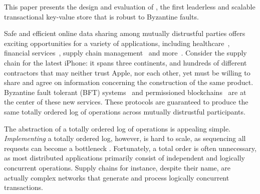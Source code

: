 \iffalse
Please check these links from the ref.bib yourself. Most of them are internet pages. (some only secondary sources, i.e. articles, so they may be useless). Some whitepapers\\
Health: \cite{HyperledgerHealth}\\
Insurance Services \cite{StateFarmSubrogation}   secondary sources: \cite{StateFarmQuorum, StateFarmQuorum2}\\
Financial: \cite{IBMSettlements, Libra}\\
Supply Chain:  \cite{IBMFoodSupply, DeloitteSupply}   secondary sources: \cite{SupplyExamples,}\\
Other:  \cite{HyperledgerTelecom}  secondary sources: \cite{AutoInventory}\\
\fi


This paper presents the design and evaluation of \sys{}, the first leaderless and scalable transactional key-value store that is robust to Byzantine faults.

Safe and efficient online data sharing among mutually distrustful
parties offers exciting opportunities for a variety of applications,
including healthcare~\cite{HyperledgerHealth}, financial services~\cite{IBMSettlements, Libra, StateFarmSubrogation}, supply chain
management~\cite{IBMFoodSupply, DeloitteSupply} and more~\cite{HyperledgerTelecom}. Consider the supply chain for the latest iPhone: it spans three continents, and hundreds of different contractors \cite{AppleSup} that may neither trust Apple, nor each other, yet must be willing to share and agree on information concerning the construction of the same product.
Byzantine fault tolerant (BFT)
systems~\cite{castro1999practical,martin2006fast,kotla2007zyzzyva,  gueta2018sbft,clement2009making,buchman2016tendermint,yin2019hotstuff,Clement09Upright,duan2014hbft, pires2018generalized,bessani2014state,lamport2011byzantizing,arun2019ezbft, malkhi2019flexible,duan2014hbft,yin2003separating, Guerraoui08Next, Kotla04High,liskov2010viewstamped} and permissioned blockchains~\cite{Hyperledger,EthereumQuorum, buchman2016tendermint, al2017chainspace,kokoris2018omniledger,gilad2017algorand, baudet2019state} are at the center of these new services. These protocols are guaranteed to
produce the same totally ordered log of operations across mutually distrustful
participants. 

The abstraction of a totally ordered log of operations is appealing simple. {\em Implementing} a totally ordered log, however, is hard to scale, as sequencing all requests can become a bottleneck . Fortunately, a total order is  often unnecessary, as most distributed applications primarily consist of independent and logically concurrent operations. Supply chains for instance, despite their name, are actually complex networks that generate and process logically concurrent transactions. 


